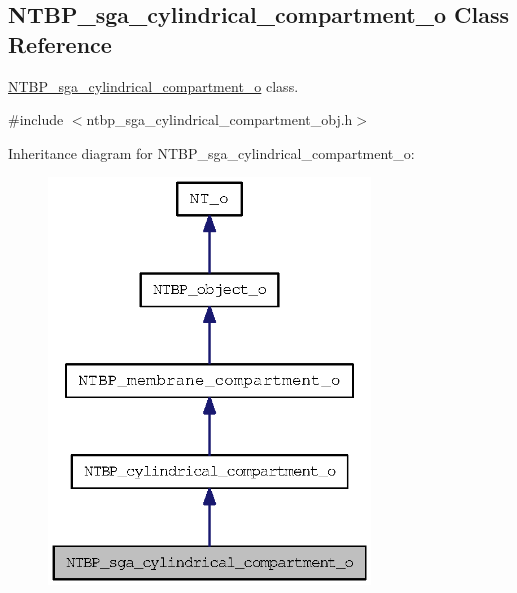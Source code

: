 \subsection{NTBP\_\-sga\_\-cylindrical\_\-compartment\_\-o Class Reference}
\label{class_n_t_b_p__sga__cylindrical__compartment__o}


\hyperlink{class_n_t_b_p__sga__cylindrical__compartment__o}{NTBP\_\-sga\_\-cylindrical\_\-compartment\_\-o} class.  




{\ttfamily \#include $<$ntbp\_\-sga\_\-cylindrical\_\-compartment\_\-obj.h$>$}



Inheritance diagram for NTBP\_\-sga\_\-cylindrical\_\-compartment\_\-o:
\nopagebreak
\begin{figure}[H]
\begin{center}
\leavevmode
\includegraphics[width=242pt]{class_n_t_b_p__sga__cylindrical__compartment__o__inherit__graph}
\end{center}
\end{figure}


